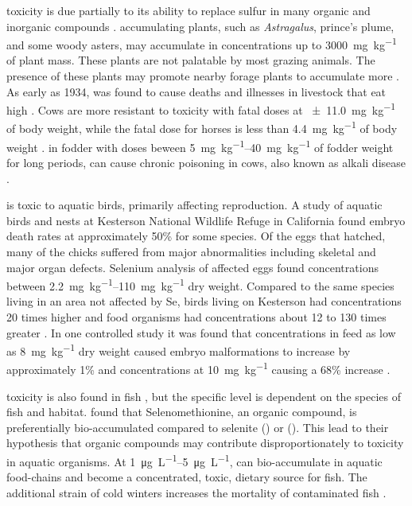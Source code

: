 \begin{linenumbers}[1]
\Se toxicity is due partially to its ability to replace sulfur in many organic and inorganic compounds \parencite{Besser1989}.  \Se accumulating plants, such as \textit{Astragalus}, prince's plume, and some woody asters, may accumulate \Se in concentrations up to \SI{3000}{\milli\g\per\kilo\g} of plant mass.  These plants are not palatable by most grazing animals.  The presence of these plants may promote nearby forage plants to accumulate more \Se \parencite{2006USDA}.  As early as 1934, \Se was found to cause deaths and illnesses in livestock that eat high \Se \parencite{scott1973,Rohwer1931,Besser1989,2006USDA}.  Cows are more resistant to \Se toxicity with fatal doses at \SI{\pm11.0}{\milli\g\per\kilo\g} of body weight, while the fatal dose for horses is less than \SI{4.4}{\milli\g\per\kilo\g} of body weight \parencite{Painter1940}.  \Se in fodder with doses beween \SIrange{5}{40}{\milli\g\per\kilo\g} of fodder weight for long periods, can cause chronic poisoning in cows, also known as alkali disease \parencite{2006USDA}.

\Se is toxic to aquatic birds, primarily affecting reproduction.  A study of aquatic birds and nests at Kesterson National Wildlife Refuge in California found embryo death rates at approximately 50\% for some species.  Of the eggs that hatched, many of the chicks suffered from major abnormalities including skeletal and major organ defects.  Selenium analysis of affected eggs found concentrations between \SIrange{2.2}{110}{\milli\g\per\kilo\g} dry weight.  Compared to the same species living in an area not affected by Se, birds living on Kesterson had \Se concentrations 20 times higher and food organisms had \Se concentrations about 12 to 130 times greater \parencite{Ohlendorf1986}.  In one controlled study it was found that \Se concentrations in feed as low as \SI{8}{\milli\g\per\kilo\g} dry weight caused embryo malformations to increase by approximately 1\% and concentrations at  \SI{10}{\milli\g\per\kilo\g} causing a 68\% increase \parencite{2002Spallholz}.

\Se toxicity is also found in fish \parencite{gillespie1986,Lemly1988}, but the specific level is dependent on the species of fish and habitat.  \textcite{Besser1989} found that Selenomethionine, an organic \Se compound, is preferentially bio-accumulated compared to selenite (\selenite) or  (\selenate).  This lead to their hypothesis that organic \Se compounds may contribute disproportionately to toxicity in aquatic organisms.  At \SIrange{1}{5}{\micro\g\per\liter}, \Se can bio-accumulate in aquatic food-chains and become a concentrated, toxic, dietary source for fish.  The additional strain of cold winters increases the mortality of \Se contaminated fish \parencite{Lemly1993}.  


\end{linenumbers}
